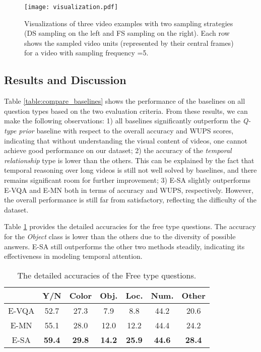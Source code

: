 \documentclass[letterpaper]{article} \usepackage{aaai19}  \usepackage{times}  \usepackage{helvet}  \usepackage{courier}  \usepackage{url}  \usepackage{graphicx}  \usepackage{amsfonts}
\begin{document}
\begin{figure*}
\centering
\texttt{[image: visualization.pdf]}
\caption{Visualizations of three video examples with two sampling strategies (DS sampling on the left and FS sampling on the right). Each row shows the sampled video units (represented by their central frames) for a video with sampling frequency =5.}
\label{fig:vis_sampling}
\vspace{-10pt}
\end{figure*}

\subsection{Results and Discussion}

Table \ref{table:compare_baselines} shows the performance of the baselines on all question types based on the two evaluation criteria. From these results, we can make the following observations: 1) all baselines significantly outperform the \emph{Q-type prior} baseline with respect to the overall accuracy and WUPS scores, indicating that without understanding the visual content of videos, one cannot achieve good performance on our dataset; 2) the accuracy of the \emph{temporal relationship} type is lower than the others. This can be explained by the fact that temporal reasoning over long videos is still not well solved by baselines, and there remains significant room for further improvement; 3) E-SA slightly outperforms E-VQA and E-MN both in terms of accuracy and WUPS, respectively. However, the overall performance is still far from satisfactory, reflecting the difficulty of the dataset.

Table \ref{table:free_type} provides the detailed accuracies for the free type questions. The accuracy for the \emph{Object} class is lower than the others due to the diversity of possible answers. E-SA still outperforms the other two methods steadily, indicating its effectiveness in modeling temporal attention.

\begin{table}
\centering
\caption{The detailed accuracies of the Free type questions.}
\label{table:free_type}
\begin{tabular}{c|cccccc}
\toprule
 & Y/N & Color & Obj.& Loc.  & Num. & Other \\
\midrule
E-VQA &52.7 &	27.3&	7.9&	8.8&	44.2&	20.6	\\
E-MN &55.1&	28.0&	12.0&	12.2&	44.4&	24.2\\
E-SA & \textbf{59.4} & \textbf{29.8} & \textbf{14.2} & \textbf{25.9} & \textbf{44.6} & \textbf{28.4}\\
\bottomrule
\end{tabular}
\end{table}
\end{document}
